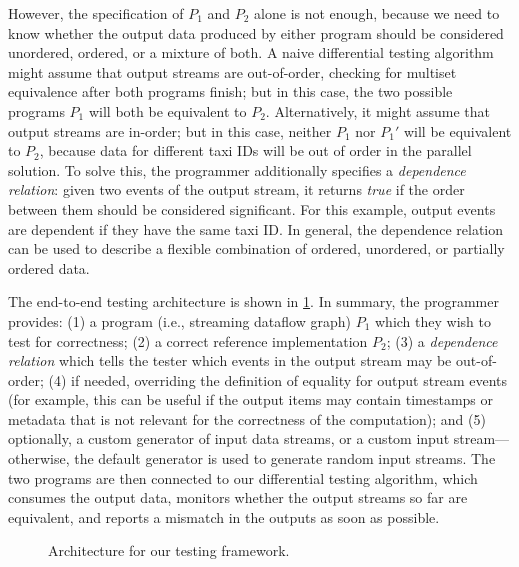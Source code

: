 However, the specification of $P_1$ and $P_2$ alone is not enough, because we need to know whether the output data produced by either program should be considered unordered, ordered, or a mixture of both.
A naive differential testing algorithm might assume that output streams are out-of-order, checking for multiset equivalence after both programs finish; but in this case, the two possible programs $P_1$ will both be equivalent to $P_2$. Alternatively, it might assume that output streams are in-order; but in this case, neither $P_1$ nor $P_1'$ will be equivalent to $P_2$, because data for different taxi IDs will be out of order in the parallel solution.
To solve this, the programmer additionally specifies a \emph{dependence relation}: given two events of the output stream, it returns \emph{true} if the order between them should be considered significant. For this example, output events are dependent if they have the same taxi ID. In general, the dependence relation can be used to describe a flexible
combination of ordered, unordered, or partially ordered data.

The end-to-end testing architecture is shown in \cref{fig:system-architecture}. In summary, the programmer provides: (1) a program (i.e., streaming dataflow graph) $P_1$ which they wish to test for correctness; (2) a correct reference implementation $P_2$; (3) a \emph{dependence relation} which tells the tester which events in the output stream may be out-of-order;
(4) if needed, overriding the definition of equality for output stream events (for example, this can be useful if the output items may contain timestamps or metadata that is not relevant for the correctness of the computation); and
(5) optionally, a custom generator of input data streams, or a custom input stream---otherwise, the default generator is used to generate random input streams. The two programs are then connected to our differential testing algorithm, which consumes the output data, monitors whether the output streams so far are equivalent, and reports a mismatch
in the outputs as soon as possible.

\begin{figure}[tb]
\centering
\small


\caption{Architecture for our testing framework.}
\label{fig:system-architecture}
\end{figure}


